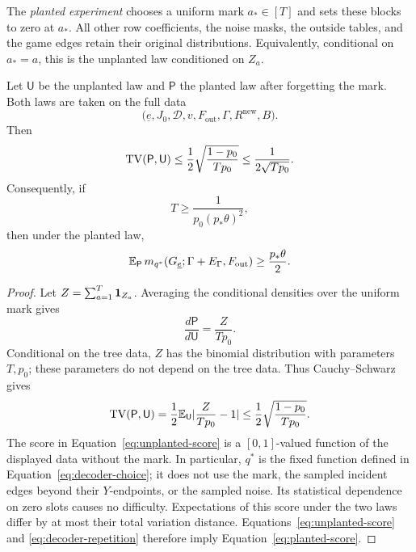 The \emph{planted experiment} chooses a uniform mark $a_*\in[T]$ and
sets these blocks to zero at $a_*$.  All other row coefficients, the
noise masks, the outside tables, and the game edges retain their
original distributions.  Equivalently, conditional on $a_*=a$, this
is the unplanted law conditioned on $Z_a$.

\begin{lemma}\label{lem:planting}
Let $\mathsf U$ be the unplanted law and $\mathsf P$ the planted law
after forgetting the mark.  Both laws are taken on the full data
\[
 \bigl(\underline e,J_0,\mathcal D,v,F_{\mathrm{out}},
        \Gamma,R^{\mathrm{new}},B\bigr).
\]
Then
\begin{equation}\label{eq:planting-tv}
 \operatorname{TV}(\mathsf P,\mathsf U)
 \leq \frac12\sqrt{\frac{1-p_0}{Tp_0}}
 \leq \frac{1}{2\sqrt{Tp_0}}.
\end{equation}
Consequently, if
\begin{equation}\label{eq:decoder-repetition}
 T\geq\frac{1}{p_0(p_*\theta)^2},
\end{equation}
then under the planted law,
\begin{equation}\label{eq:planted-score}
 \mathbb E_{\mathsf P}\,m_{q^*}(G_{\underline e};
               \Gamma+E_\Gamma,F_{\mathrm{out}})
 \geq \frac{p_*\theta}{2}.
\end{equation}
\end{lemma}

\begin{proof}
Let $Z=\sum_{a=1}^T\mathbf 1_{Z_a}$.  Averaging the conditional densities
over the uniform mark gives
\[
 \frac{d\mathsf P}{d\mathsf U}=\frac{Z}{Tp_0}.
\]
Conditional on the tree data, $Z$ has the binomial distribution with
parameters $T,p_0$; these parameters do not depend on the tree data.
Thus Cauchy--Schwarz gives
\[
 \operatorname{TV}(\mathsf P,\mathsf U)
 =\frac12\mathbb E_{\mathsf U}\lvert\frac{Z}{Tp_0}-1\rvert
 \leq\frac12\sqrt{\frac{1-p_0}{Tp_0}}.
\]
The score in Equation~\eqref{eq:unplanted-score} is a $[0,1]$-valued
function of the displayed data without the mark.  In particular,
$q^*$ is the fixed function defined in Equation~\eqref{eq:decoder-choice};
it does not use the mark, the sampled incident edges beyond their
$Y$-endpoints, or the sampled noise.  Its statistical dependence on
zero slots causes no difficulty.  Expectations of this score under
the two laws differ by at most their total variation distance.
Equations~\eqref{eq:unplanted-score} and
\eqref{eq:decoder-repetition} therefore imply
Equation~\eqref{eq:planted-score}.
\end{proof}


